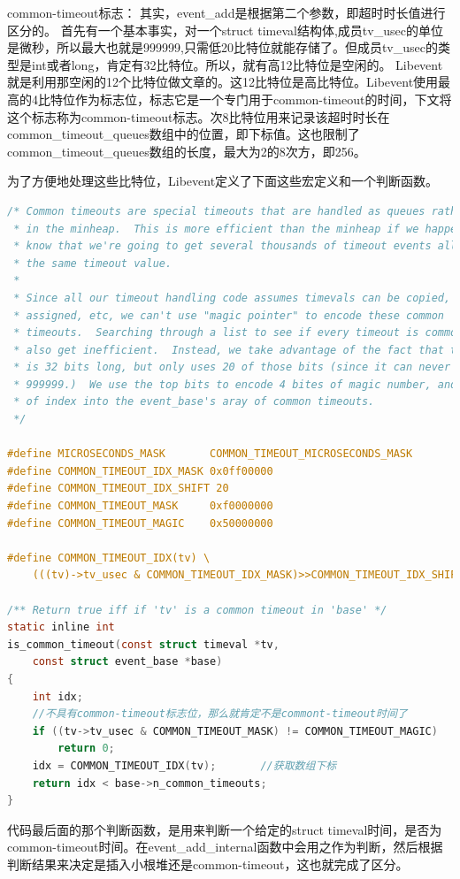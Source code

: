 \documentclass[11pt,a4paper]{article}
\begin{document}
common-timeout标志： 
        其实，event\_add是根据第二个参数，即超时时长值进行区分的。
        首先有一个基本事实，对一个struct timeval结构体,成员tv\_usec的单位是微秒，所以最大也就是999999,只需低20比特位就能存储了。但成员tv\_usec的类型是int或者long，肯定有32比特位。所以，就有高12比特位是空闲的。
        Libevent就是利用那空闲的12个比特位做文章的。这12比特位是高比特位。Libevent使用最高的4比特位作为标志位，标志它是一个专门用于common-timeout的时间，下文将这个标志称为common-timeout标志。次8比特位用来记录该超时时长在common\_timeout\_queues数组中的位置，即下标值。这也限制了common\_timeout\_queues数组的长度，最大为2的8次方，即256。

为了方便地处理这些比特位，Libevent定义了下面这些宏定义和一个判断函数。
\begin{lstlisting}[language=C]
/* Common timeouts are special timeouts that are handled as queues rather than
 * in the minheap.  This is more efficient than the minheap if we happen to
 * know that we're going to get several thousands of timeout events all with
 * the same timeout value.
 *
 * Since all our timeout handling code assumes timevals can be copied,
 * assigned, etc, we can't use "magic pointer" to encode these common
 * timeouts.  Searching through a list to see if every timeout is common could
 * also get inefficient.  Instead, we take advantage of the fact that tv_usec
 * is 32 bits long, but only uses 20 of those bits (since it can never be over
 * 999999.)  We use the top bits to encode 4 bites of magic number, and 8 bits
 * of index into the event_base's aray of common timeouts.
 */

#define MICROSECONDS_MASK       COMMON_TIMEOUT_MICROSECONDS_MASK
#define COMMON_TIMEOUT_IDX_MASK 0x0ff00000
#define COMMON_TIMEOUT_IDX_SHIFT 20
#define COMMON_TIMEOUT_MASK     0xf0000000
#define COMMON_TIMEOUT_MAGIC    0x50000000

#define COMMON_TIMEOUT_IDX(tv) \
	(((tv)->tv_usec & COMMON_TIMEOUT_IDX_MASK)>>COMMON_TIMEOUT_IDX_SHIFT)

/** Return true iff if 'tv' is a common timeout in 'base' */
static inline int
is_common_timeout(const struct timeval *tv,
    const struct event_base *base)
{
	int idx;
	//不具有common-timeout标志位，那么就肯定不是commont-timeout时间了
	if ((tv->tv_usec & COMMON_TIMEOUT_MASK) != COMMON_TIMEOUT_MAGIC)
		return 0;
	idx = COMMON_TIMEOUT_IDX(tv);		//获取数组下标
	return idx < base->n_common_timeouts;
}
\end{lstlisting}
代码最后面的那个判断函数，是用来判断一个给定的struct timeval时间，是否为common-timeout时间。在event\_add\_internal函数中会用之作为判断，然后根据判断结果来决定是插入小根堆还是common-timeout，这也就完成了区分。
\end{document}
